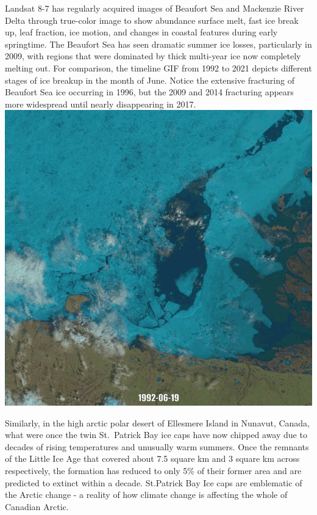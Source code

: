 \documentclass[
]{book}
\begin{document}
Landsat 8-7 has regularly acquired images of Beaufort Sea and Mackenzie River Delta through true-color image to show abundance surface melt, fast ice break up, leaf fraction, ice motion, and changes in coastal features during early springtime. The Beaufort Sea has seen dramatic summer ice losses, particularly in 2009, with regions that were dominated by thick multi-year ice now completely melting out. For comparison, the timeline GIF from 1992 to 2021 depicts different stages of ice breakup in the month of June. Notice the extensive fracturing of Beaufort Sea ice occurring in 1996, but the 2009 and 2014 fracturing appears more widespread until nearly disappearing in 2017.\\
\includegraphics{images/14-Beaufort-Sea-Ice.gif}

Similarly, in the high arctic polar desert of Ellesmere Island in Nunavut, Canada, what were once the twin St.~Patrick Bay ice caps have now chipped away due to decades of rising temperatures and unusually warm summers. Once the remnants of the Little Ice Age that covered about 7.5 square km and 3 square km across respectively, the formation has reduced to only 5\% of their former area and are predicted to extinct within a decade. St.Patrick Bay Ice caps are emblematic of the Arctic change - a reality of how climate change is affecting the whole of Canadian Arctic.

\hypertarget{container}{}
\end{document}
